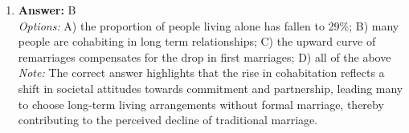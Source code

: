 \documentclass[12pt]{article}
\begin{document}
\begin{enumerate}[label=\arabic*.]
\\ \textit{Options:} A) Prime Minister, Archbishop of York, Viscounts of England; B) Marquesses of England, Earls of Great Britain, King's Brothers; C) Esquires, Serjeants of Law, Dukes' Eldest Sons; D) King's Grandsons, Lord High Treasurer, Companions of the Bath
\\ \textit{Note:} The correct answer reflects the traditional hierarchy of British nobility, where the king's grandsons hold the highest status as royal family members, followed by the Lord High Treasurer, a significant political figure, and then the Companions of the Bath, who are typically lesser-ranking honors within the British honors system.
\item \textbf{Answer:} B
\\ \textit{Options:} A) the proportion of people living alone has fallen to 29\%; B) many people are cohabiting in long term relationships; C) the upward curve of remarriages compensates for the drop in first marriages; D) all of the above
\\ \textit{Note:} The correct answer highlights that the rise in cohabitation reflects a shift in societal attitudes towards commitment and partnership, leading many to choose long-term living arrangements without formal marriage, thereby contributing to the perceived decline of traditional marriage.
\end{enumerate}
\end{document}
